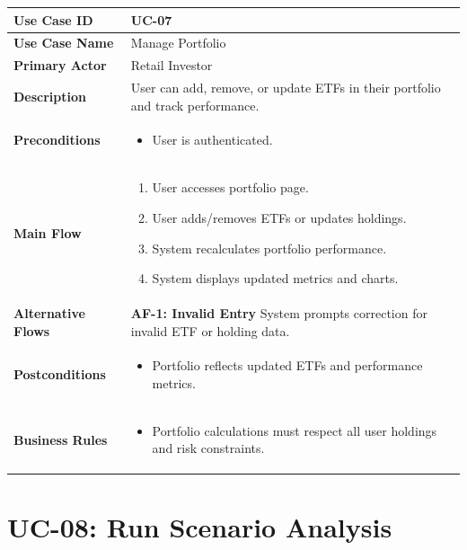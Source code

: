 \begin{longtable}{|>{\raggedright\arraybackslash\bfseries}p{3.5cm}|p{11cm}|}
\hline
\rowcolor{gray!15} Use Case ID & UC-07 \\ \hline
Use Case Name & Manage Portfolio \\ \hline
Primary Actor & Retail Investor \\ \hline
Description & User can add, remove, or update ETFs in their portfolio and track performance. \\ \hline
Preconditions &
\begin{itemize}[leftmargin=*, nosep]
    \item User is authenticated.
\end{itemize} \\ \hline
Main Flow &
\begin{enumerate}[leftmargin=*, nosep]
    \item User accesses portfolio page.
    \item User adds/removes ETFs or updates holdings.
    \item System recalculates portfolio performance.
    \item System displays updated metrics and charts.
\end{enumerate} \\ \hline
Alternative Flows &
\textbf{AF-1: Invalid Entry} \newline
System prompts correction for invalid ETF or holding data. \\ \hline
Postconditions &
\begin{itemize}[leftmargin=*, nosep]
    \item Portfolio reflects updated ETFs and performance metrics.
\end{itemize} \\ \hline
Business Rules &
\begin{itemize}[leftmargin=*, nosep]
    \item Portfolio calculations must respect all user holdings and risk constraints.
\end{itemize} \\ \hline
\end{longtable}

\section{UC-08: Run Scenario Analysis}
\label{uc:scenario}

